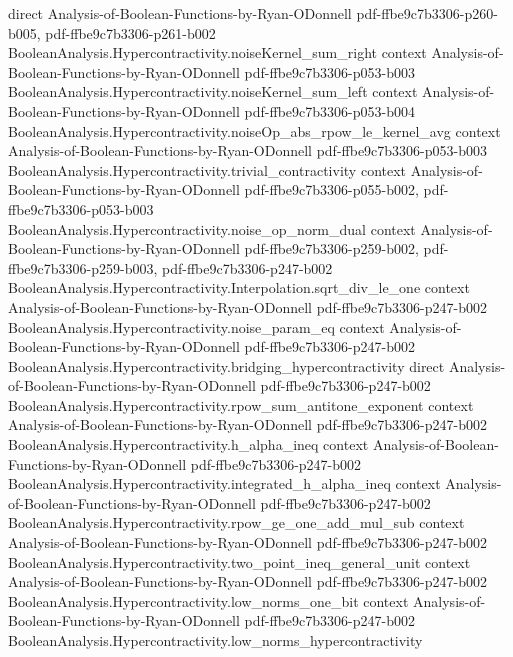 \begin{lemma}
  {direct}
  {Analysis-of-Boolean-Functions-by-Ryan-ODonnell}
  {pdf-ffbe9c7b3306-p260-b005,
    pdf-ffbe9c7b3306-p261-b002}
\proofstep
  {BooleanAnalysis.Hypercontractivity.noiseKernel_sum_right}
  {context}
  {Analysis-of-Boolean-Functions-by-Ryan-ODonnell}
  {pdf-ffbe9c7b3306-p053-b003}
\proofstep
  {BooleanAnalysis.Hypercontractivity.noiseKernel_sum_left}
  {context}
  {Analysis-of-Boolean-Functions-by-Ryan-ODonnell}
  {pdf-ffbe9c7b3306-p053-b004}
\proofstep
  {BooleanAnalysis.Hypercontractivity.noiseOp_abs_rpow_le_kernel_avg}
  {context}
  {Analysis-of-Boolean-Functions-by-Ryan-ODonnell}
  {pdf-ffbe9c7b3306-p053-b003}
\proofstep
  {BooleanAnalysis.Hypercontractivity.trivial_contractivity}
  {context}
  {Analysis-of-Boolean-Functions-by-Ryan-ODonnell}
  {pdf-ffbe9c7b3306-p055-b002,
    pdf-ffbe9c7b3306-p053-b003}
\proofstep
  {BooleanAnalysis.Hypercontractivity.noise_op_norm_dual}
  {context}
  {Analysis-of-Boolean-Functions-by-Ryan-ODonnell}
  {pdf-ffbe9c7b3306-p259-b002,
    pdf-ffbe9c7b3306-p259-b003,
    pdf-ffbe9c7b3306-p247-b002}
\proofstep
  {BooleanAnalysis.Hypercontractivity.Interpolation.sqrt_div_le_one}
  {context}
  {Analysis-of-Boolean-Functions-by-Ryan-ODonnell}
  {pdf-ffbe9c7b3306-p247-b002}
\proofstep
  {BooleanAnalysis.Hypercontractivity.noise_param_eq}
  {context}
  {Analysis-of-Boolean-Functions-by-Ryan-ODonnell}
  {pdf-ffbe9c7b3306-p247-b002}
\proofstep
  {BooleanAnalysis.Hypercontractivity.bridging_hypercontractivity}
  {direct}
  {Analysis-of-Boolean-Functions-by-Ryan-ODonnell}
  {pdf-ffbe9c7b3306-p247-b002}
\proofstep
  {BooleanAnalysis.Hypercontractivity.rpow_sum_antitone_exponent}
  {context}
  {Analysis-of-Boolean-Functions-by-Ryan-ODonnell}
  {pdf-ffbe9c7b3306-p247-b002}
\proofstep
  {BooleanAnalysis.Hypercontractivity.h_alpha_ineq}
  {context}
  {Analysis-of-Boolean-Functions-by-Ryan-ODonnell}
  {pdf-ffbe9c7b3306-p247-b002}
\proofstep
  {BooleanAnalysis.Hypercontractivity.integrated_h_alpha_ineq}
  {context}
  {Analysis-of-Boolean-Functions-by-Ryan-ODonnell}
  {pdf-ffbe9c7b3306-p247-b002}
\proofstep
  {BooleanAnalysis.Hypercontractivity.rpow_ge_one_add_mul_sub}
  {context}
  {Analysis-of-Boolean-Functions-by-Ryan-ODonnell}
  {pdf-ffbe9c7b3306-p247-b002}
\proofstep
  {BooleanAnalysis.Hypercontractivity.two_point_ineq_general_unit}
  {context}
  {Analysis-of-Boolean-Functions-by-Ryan-ODonnell}
  {pdf-ffbe9c7b3306-p247-b002}
\proofstep
  {BooleanAnalysis.Hypercontractivity.low_norms_one_bit}
  {context}
  {Analysis-of-Boolean-Functions-by-Ryan-ODonnell}
  {pdf-ffbe9c7b3306-p247-b002}
\proofstep
  {BooleanAnalysis.Hypercontractivity.low_norms_hypercontractivity}

\end{lemma}
